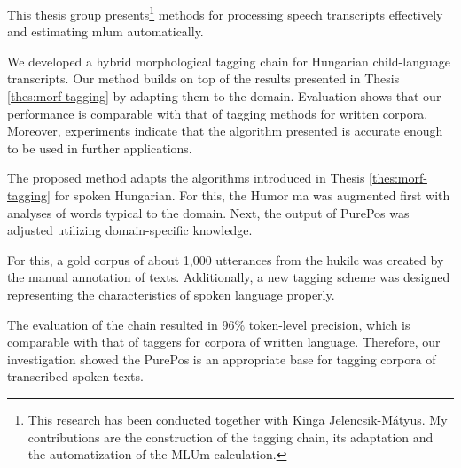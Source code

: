 This thesis group presents\footnote{This research has been conducted together with Kinga Jelencsik-Mátyus. 
My contributions are the construction of the tagging chain, its adaptation and the automatization of the MLUm calculation.} methods for processing speech transcripts effectively and estimating \acrlong{mlum} automatically.


\begin{core}
\begin{thesis}
\label{thes:spoken-morf-tagging}
We developed a hybrid morphological tagging chain for Hungarian child-language transcripts.
Our method builds on top of the results presented in Thesis \ref{thes:morf-tagging} by adapting them to the domain.
Evaluation shows that our performance is comparable with that of tagging methods for written corpora.
Moreover, experiments indicate that the algorithm presented is accurate enough to be used in further applications.
\end{thesis}

\begin{pub}
\cite{Matyus2014,Orosz2014c}
\end{pub}
\end{core}

The proposed method adapts the algorithms introduced in Thesis \ref{thes:morf-tagging} for spoken Hungarian.
For this, the Humor \acrlong{ma} was augmented first with analyses of words typical to the domain.
Next, the output of PurePos was adjusted utilizing domain-specific knowledge.

For this, a gold corpus of about 1,000 utterances from the \acrshort{hukilc} was created by the manual annotation of texts. 
Additionally, a new tagging scheme was designed representing the characteristics of spoken language properly.

The evaluation of the chain resulted in 96\% token-level precision, which is comparable with that of taggers for corpora of written language.
Therefore, our investigation showed the PurePos is an appropriate base for tagging corpora of transcribed spoken texts.

\thesisline%


